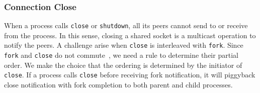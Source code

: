 \subsubsection{Connection Close}
\label{subsubsec:fork_close}



When a process calls \texttt{close} or \texttt{shutdown}, all its peers cannot send to or receive from the process. In this sense, closing a shared socket is a multicast operation to notify the peers. A challenge arise when \texttt{close} is interleaved with \texttt{fork}. Since \texttt{fork} and \texttt{close} do not commute~\cite{clements2015scalable}, we need a rule to determine their partial order. We make the choice that the ordering is determined by the initiator of \texttt{close}. If a process calls \texttt{close} before receiving fork notification, it will piggyback close notification with fork completion to both parent and child processes.



